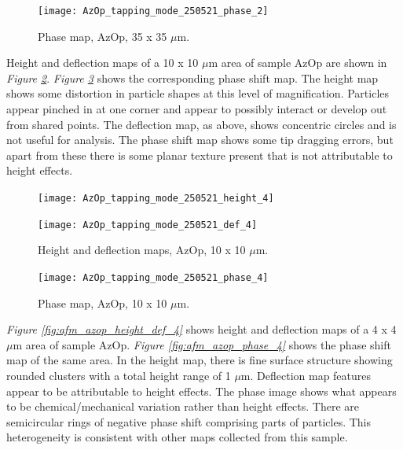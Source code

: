 \begin{figure}[H]
\centering
  \texttt{[image: AzOp\_tapping\_mode\_250521\_phase\_2]}
\caption[Phase map, AzOp]{Phase map, AzOp, 35 x 35 $\mu$m.}
\label{fig:afm_azop_phase_2}
\end{figure}

Height and deflection maps of a 10 x 10 $\mu$m area of sample AzOp are shown in \textit{Figure \ref{fig:afm_azop_height_def_3}}. \textit{Figure \ref{fig:afm_azop_phase_3}} shows the corresponding phase shift map. The height map shows some distortion in particle shapes at this level of magnification. Particles appear pinched in at one corner and appear to possibly interact or develop out from shared points. The deflection map, as above, shows concentric circles and is not useful for analysis. The phase shift map shows some tip dragging errors, but apart from these there is some planar texture present that is not attributable to height effects.

\begin{figure}[H]
\centering
\begin{minipage}{.45\textwidth}
  \centering
  \texttt{[image: AzOp\_tapping\_mode\_250521\_height\_4]}
\end{minipage}
\begin{minipage}{.45\textwidth}
  \centering
  \texttt{[image: AzOp\_tapping\_mode\_250521\_def\_4]}
\end{minipage}
\caption[Height and deflection maps, AzOp]{Height and deflection maps, AzOp, 10 x 10 $\mu$m.}
\label{fig:afm_azop_height_def_3}
\end{figure}

\begin{figure}[H]
\centering
  \texttt{[image: AzOp\_tapping\_mode\_250521\_phase\_4]}
\caption[Phase map, AzOp]{Phase map, AzOp, 10 x 10 $\mu$m.}
\label{fig:afm_azop_phase_3}
\end{figure}

\textit{Figure \ref{fig:afm_azop_height_def_4}} shows height and deflection maps of a 4 x 4 $\mu$m area of sample AzOp. \textit{Figure \ref{fig:afm_azop_phase_4}} shows the phase shift map of the same area. In the height map, there is fine surface structure showing rounded clusters with a total height range of 1 $\mu$m. Deflection map features appear to be attributable to height effects. The phase image shows what appears to be chemical/mechanical variation rather than height effects. There are semicircular rings of negative phase shift comprising parts of particles. This heterogeneity is consistent with other maps collected from this sample.

